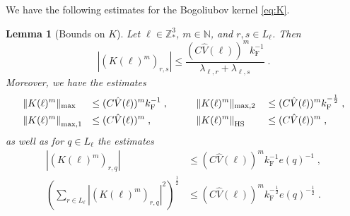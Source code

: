 \documentclass[12pt,a4paper]{article}
\numberwithin{equation}{section}
\newcommand{\1}{\mathbb{I}}
\newcommand{\F}{\mathrm{F}}
\newcommand{\HS}{\mathrm{HS}}
\newcommand{\Z}{\mathbb{Z}}
\newcommand{\half}{\frac{1}{2}}
\newcommand{\normmaxi}[1]{\norm{#1}_{\mathrm{max,1}}}
\theoremstyle{plain}
\newtheorem{lemma}[theorem]{Lemma}
\theoremstyle{definition}
\theoremstyle{remark}
\theoremstyle{plain}
\theoremstyle{definition}
\theoremstyle{remark}
\begin{document}
We have the following estimates for the Bogoliubov kernel \cref{eq:K}.
\begin{lemma}[Bounds on $ K $]\label{lem:normsk}
Let $ \ell \in \Z^3_* $, $ m \in \mathbb{N} $, and $ r,s \in L_\ell $. Then
\begin{equation} \label{eq:K_element_bounds}
	|(K(\ell)^m)_{r,s}|
	\le \frac{(C \hat{V}(\ell))^m k_{\F}^{-1}}{\lambda_{\ell,r} + \lambda_{\ell,s}} \;.
\end{equation}
Moreover, we have the estimates
\begin{equation} \label{eq:K_max_bounds}
\begin{aligned}
	&\Vert K(\ell)^m \Vert_{\max}
	&\le \; &(C \hat{V}(\ell))^m k_{\F}^{-1} \;, \qquad
	&&\Vert K(\ell)^m \Vert_{\max,2}
	&&\le (C \hat{V}(\ell))^m k_{\F}^{-\half} \;, \\
	&\normmaxi{K(\ell)^m}
	&\le \; &(C \hat{V}(\ell))^m \;, \qquad
	&&\norm{K(\ell)^m}_{\HS}
	&&\le (C \hat{V}(\ell))^m \;,
\end{aligned} 
\end{equation}
as well as for $ q \in L_\ell $ the estimates
\begin{equation} \label{eq:e(q)_extraction_bounds}
\begin{split}
	|(K(\ell)^m)_{r,q}|
	& \le (C \hat{V}(\ell))^m k_{\F}^{-1} e(q)^{-1} \;, \\
	\left( \sum_{r \in L_\ell} |(K(\ell)^m)_{r,q}|^2 \right)^{\half}
	& \le (C \hat{V}(\ell))^m k_{\F}^{-\half} e(q)^{-\half} \;.
\end{split}
\end{equation}
\end{lemma}
\end{document}
